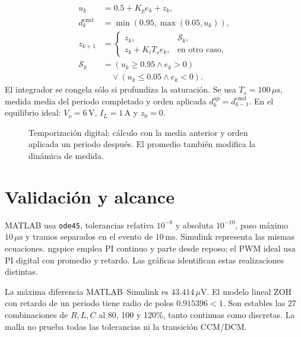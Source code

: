 \documentclass[conference,letterpaper]{IEEEtran}
\begin{document}
\begin{equation}\label{eq:discrete}\begin{aligned}u_k&=0.5+K_pe_k+z_k,\\d_k^{\mathrm{cmd}}&=\min(0.95,\max(0.05,u_k)),\\z_{k+1}&=\begin{cases}z_k,&\mathcal S_k,\\z_k+K_iT_se_k,&\text{en otro caso},\end{cases}\\\mathcal S_k&=(u_k\geq0.95\land e_k>0)\\&\quad\lor(u_k\leq0.05\land e_k<0).\end{aligned}\end{equation}
El integrador se congela sólo si profundiza la saturación. Se usa $T_s=100\,\mu\mathrm{s}$, medida media del periodo completado y orden aplicada $d_k^{\mathrm{ap}}=d_{k-1}^{\mathrm{cmd}}$. En el equilibrio ideal: $V_o=6\,\mathrm{V}$, $I_L=1\,\mathrm{A}$ y $z_0=0$.

\begin{figure}[H]\centering{}\caption{Temporización digital: cálculo con la media anterior y orden aplicada un periodo después. El promedio también modifica la dinámica de medida.}\label{fig:timing}\end{figure}
\section{Validación y alcance}
MATLAB usa \texttt{ode45}, tolerancias relativa $10^{-8}$ y absoluta $10^{-10}$, paso máximo $10\,\mu\mathrm{s}$ y tramos separados en el evento de $10\,\mathrm{ms}$. Simulink representa las mismas ecuaciones. ngspice emplea PI continuo y parte desde reposo; el PWM ideal usa PI digital con promedio y retardo. Las gráficas identifican estas realizaciones distintas.

La máxima diferencia MATLAB--Simulink es $43.414\,\mu\mathrm{V}$. El modelo lineal ZOH con retardo de un periodo tiene radio de polos $0.915396<1$. Son estables las 27 combinaciones de $R,L,C$ al 80, 100 y 120\%, tanto continuas como discretas. La malla no prueba todas las tolerancias ni la transición CCM/DCM.
\end{document}
